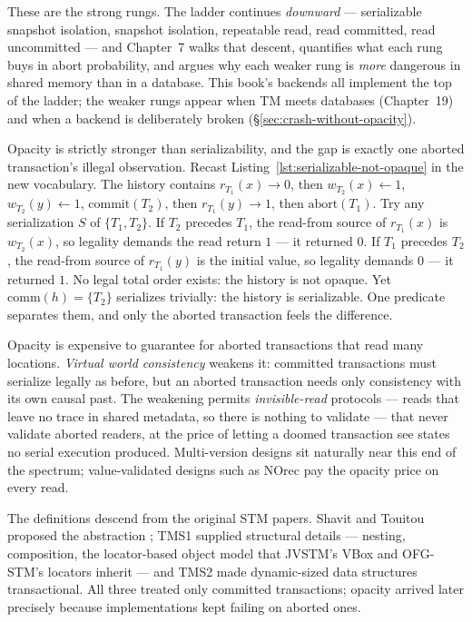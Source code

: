 These are the strong rungs. The ladder continues \emph{downward} ---
serializable snapshot isolation, snapshot isolation, repeatable read, read
committed, read uncommitted --- and Chapter~7 walks that descent, quantifies
what each rung buys in abort probability, and argues why each weaker rung is
\emph{more} dangerous in shared memory than in a database. This book's
backends all implement the top of the ladder; the weaker rungs appear when TM
meets databases (Chapter~19) and when a backend is deliberately broken
(\S\ref{sec:crash-without-opacity}).

Opacity is strictly stronger than serializability, and the gap is exactly one aborted transaction's illegal observation. Recast Listing~\ref{lst:serializable-not-opaque} in the new vocabulary. The history contains $r_{T_1}(x)\!\to\!0$, then $w_{T_2}(x)\!\leftarrow\!1$, $w_{T_2}(y)\!\leftarrow\!1$, $\mathrm{commit}(T_2)$, then $r_{T_1}(y)\!\to\!1$, then $\mathrm{abort}(T_1)$. Try any serialization $S$ of $\{T_1, T_2\}$. If $T_2$ precedes $T_1$, the read-from source of $r_{T_1}(x)$ is $w_{T_2}(x)$, so legality demands the read return $1$ --- it returned $0$. If $T_1$ precedes $T_2$, the read-from source of $r_{T_1}(y)$ is the initial value, so legality demands $0$ --- it returned $1$. No legal total order exists: the history is not opaque. Yet $\mathrm{comm}(h) = \{T_2\}$ serializes trivially: the history is serializable. One predicate separates them, and only the aborted transaction feels the difference.

Opacity is expensive to guarantee for aborted transactions that read many locations. \emph{Virtual world consistency} \cite{imbs12vwc} weakens it: committed transactions must serialize legally as before, but an aborted transaction needs only consistency with its own causal past. The weakening permits \emph{invisible-read} protocols --- reads that leave
no trace in shared metadata, so there is nothing to validate --- that never
validate aborted readers, at the price of letting a doomed transaction see states no serial execution produced. Multi-version designs sit naturally near this end of the spectrum; value-validated designs such as NOrec pay the opacity price on every read.

The definitions descend from the original STM papers. Shavit and Touitou proposed the abstraction \cite{shavit95stm}; TMS1 \cite{herlihy03tms1} supplied structural details --- nesting, composition, the locator-based object model that JVSTM's VBox and OFG-STM's locators inherit --- and TMS2 \cite{herlihy03tms2} made dynamic-sized data structures transactional. All three treated only committed transactions; opacity arrived later precisely because implementations kept failing on aborted ones.

